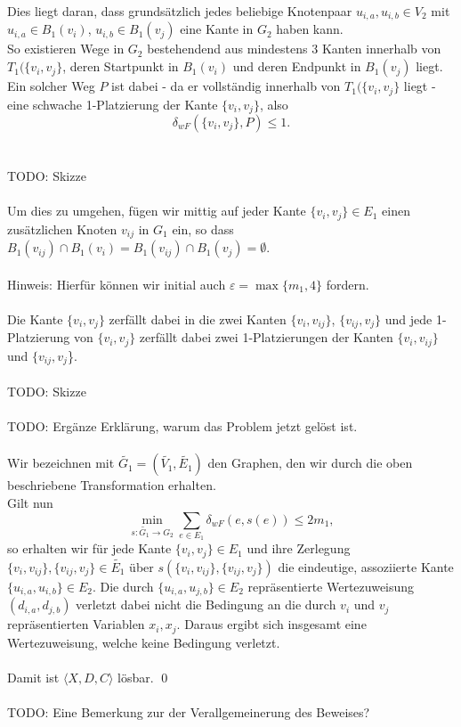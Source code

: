 \documentclass[a4paper, 12pt, twoside]{article}
\theoremstyle{Format1} %
\begin{document}
Dies liegt daran, dass grundsätzlich jedes beliebige Knotenpaar $u_{i,a}, u_{i,b} \in V_2$ mit $u_{i,a} \in B_1(v_i)$, $u_{i,b} \in B_1(v_j)$ eine Kante in $G_2$ haben kann.
\\
So existieren Wege in $G_2$ bestehendend aus mindestens 3 Kanten innerhalb von $T_1(\{v_i, v_j\}$, deren Startpunkt in $B_1(v_i)$ und deren Endpunkt in $B_1(v_j)$ liegt.
Ein solcher Weg $P$ ist dabei - da er vollständig innerhalb von $T_1(\{v_i, v_j\}$ liegt - eine schwache 1-Platzierung der Kante $\{v_i, v_j\}$, also
$$ \delta_{wF}(\{v_i, v_j\}, P) \leq 1.$$
\\
\\
TODO: Skizze
\\
\\
Um dies zu umgehen, fügen wir mittig auf jeder Kante $\{v_i, v_j\} \in E_1$ einen zusätzlichen Knoten $v_{ij}$ in $G_1$ ein,
so dass $B_1(v_{ij}) \cap B_1(v_i) = B_1(v_{ij}) \cap B_1(v_j) = \emptyset$.
\\
\\
Hinweis: Hierfür können wir initial auch $\varepsilon = \max \{m_1, 4\}$ fordern.
\\
\\
Die Kante $\{v_i, v_j\}$ zerfällt dabei in die zwei Kanten $\{v_i, v_{ij}\}$, $\{v_{ij},v_j\}$ und
jede 1-Platzierung von $\{v_i, v_j\}$ zerfällt dabei zwei 1-Platzierungen der Kanten $\{v_i, v_{ij}\}$ und $\{v_{ij}, v_j$\}.
\\
\\
TODO: Skizze
\\
\\
TODO: Ergänze Erklärung, warum das Problem jetzt gelöst ist.
\\
\\
Wir bezeichnen mit $\tilde{G_1}=(\tilde{V_1}, \tilde{E_1})$ den Graphen, den wir durch die oben beschriebene Transformation erhalten.
\\
Gilt nun
$$ \min_{s: \tilde{G_1} \to G_2} \sum_{e \in E_1} \delta_{wF}(e, s(e)) \leq 2m_1, $$
so erhalten wir für jede Kante $\{v_i, v_j\} \in E_1$ und ihre Zerlegung $\{v_i, v_{ij}\},\{v_{ij}, v_j\} \in \tilde{E_1}$
über $s(\{v_i, v_{ij}\},\{v_{ij}, v_j\})$ die eindeutige, assoziierte Kante $\{u_{i,a}, u_{i,b}\} \in E_2$.
Die durch $\{u_{i,a}, u_{j,b}\} \in E_2$ repräsentierte Wertezuweisung $(d_{i,a}, d_{j,b})$ verletzt dabei nicht die Bedingung an die
durch $v_i$ und $v_j$ repräsentierten Variablen $x_i, x_j$.
Daraus ergibt sich insgesamt eine Wertezuweisung, welche keine Bedingung verletzt.
\\
\\
Damit ist $\langle X,D,C \rangle$ lösbar. \qed
\\
\\
TODO: Eine Bemerkung zur der Verallgemeinerung des Beweises?
\\
\\
\end{document}
